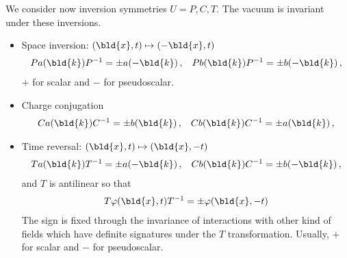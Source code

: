 We consider now inversion symmetries $U = P, C, T$. 
The vacuum is invariant under these inversions.
\begin{itemize}
\item
Space inversion:
$(\bld{x}, t) \mapsto (-\bld{x}, t)$ 
\begin{eqnarray}
P a(\bld{k}) P^{-1} = \pm a(-\bld{k})\,,
\hspace{3mm}
P b(\bld{k}) P^{-1} = \pm b(-\bld{k})\,,
\end{eqnarray}
$+$ for scalar and $-$ for pseudoscalar.
\item
Charge conjugation
\begin{eqnarray}
C a(\bld{k}) C^{-1} = \pm b(\bld{k})\,,
\hspace{3mm}
C b(\bld{k}) C^{-1} = \pm a(\bld{k})\,,
\end{eqnarray}
\item
Time reversal: $(\bld{x}, t) \mapsto (\bld{x}, -t)$ 
\begin{eqnarray}
T a(\bld{k}) T^{-1} = \pm a(-\bld{k})\,,
\hspace{3mm}
C b(\bld{k}) C^{-1} = \pm b(-\bld{k})\,,
\end{eqnarray}
and $T$ is antilinear so that
\begin{eqnarray}
T \varphi(\bld{x}, t) T^{-1} = \pm \varphi(\bld{x}, -t)
\end{eqnarray}
The sign is fixed through the invariance of interactions 
with other kind of fields which have definite signatures
under the $T$ transformation. Usually, $+$ for scalar and
$-$ for pseudoscalar.
\end{itemize}

\bigskip





